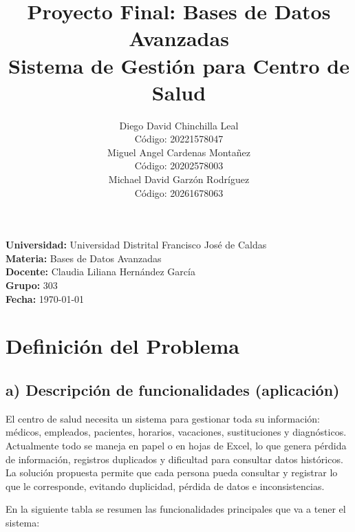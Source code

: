 \documentclass[12pt,a4paper]{article}
\title{\textbf{Proyecto Final: Bases de Datos Avanzadas}\\Sistema de Gesti\'on para Centro de Salud}
\author{
    Diego David Chinchilla Leal \\ C\'odigo: 20221578047 \\[0.3cm]
    Miguel Angel Cardenas Monta\~nez \\ C\'odigo: 20202578003 \\[0.3cm]
    Michael David Garz\'on Rodr\'iguez \\ C\'odigo: 20261678063
}
\date{}
\begin{document}
\maketitle

\begin{center}
    \textbf{Universidad:} Universidad Distrital Francisco Jos\'e de Caldas \\
    \textbf{Materia:} Bases de Datos Avanzadas \\
    \textbf{Docente:} Claudia Liliana Hern\'andez Garc\'ia \\
    \textbf{Grupo:} 303 \\
    \textbf{Fecha:} \today
\end{center}

\newpage
\tableofcontents
\newpage

\section{Definici\'on del Problema}

\subsection{a) Descripci\'on de funcionalidades (aplicaci\'on)}

El centro de salud necesita un sistema para gestionar toda su informaci\'on: m\'edicos, empleados, pacientes, horarios, vacaciones, sustituciones y diagn\'osticos. Actualmente todo se maneja en papel o en hojas de Excel, lo que genera p\'erdida de informaci\'on, registros duplicados y dificultad para consultar datos hist\'oricos. La soluci\'on propuesta permite que cada persona pueda consultar y registrar lo que le corresponde, evitando duplicidad, p\'erdida de datos e inconsistencias.

En la siguiente tabla se resumen las funcionalidades principales que va a tener el sistema:
\end{document}
